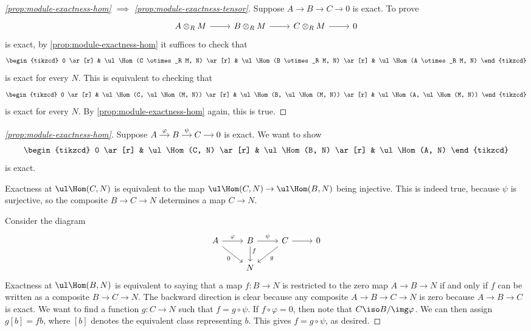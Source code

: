 \documentclass{standalone}
\begin{document}
\begin{proof}[\cref{prop:module-exactness-hom} \(\implies\)
  \cref{prop:module-exactness-tensor}]
  Suppose \(A \to B \to C \to 0\) is exact.
  To prove
  \[
    \begin{tikzcd}
    	A \otimes_R M \ar[r] &
    	B \otimes_R M \ar[r] &
    	C \otimes_R M \ar[r] &
    	0
    \end{tikzcd}
  \]
  is exact, by \cref{prop:module-exactness-hom} it suffices to check that
  \[
    \begin{tikzcd}
    	0 \ar[r] &
    	\ul\Hom(C \otimes_R M, N) \ar[r] &
    	\ul\Hom(B \otimes_R M, N) \ar[r] &
    	\ul\Hom(A \otimes_R M, N)
    \end{tikzcd}
  \]
  is exact for every \(N\).
  This is equivalent to checking that
  \[
    \begin{tikzcd}
    	0 \ar[r] &
    	\ul\Hom(C, \ul\Hom(M, N)) \ar[r] &
    	\ul\Hom(B, \ul\Hom(M, N)) \ar[r] &
    	\ul\Hom(A, \ul\Hom(M, N))
    \end{tikzcd}
  \]
  is exact for every \(N\).
  By \cref{prop:module-exactness-hom} again, this is true.
\end{proof}

\begin{proof}[\cref{prop:module-exactness-hom}]
  Suppose
  \(
    \begin{tikzcd}[cramped, column sep=small]
      A \ar[r, "\varphi"] & B \ar[r, "\psi"] & C \ar[r] & 0
    \end{tikzcd}
  \)
  is exact. We want to show
  \[
    \begin{tikzcd}
    	0 \ar[r] &
    	\ul\Hom(C, N) \ar[r] &
    	\ul\Hom(B, N) \ar[r] &
    	\ul\Hom(A, N)
    \end{tikzcd}
  \]
  is exact.

  Exactness at \(\ul\Hom(C, N)\) is equivalent to the map
  \(\ul\Hom(C, N) \to \ul\Hom(B, N)\) being injective.
  This is indeed true, because \(\psi\) is surjective,
  so the composite \(B \to C \to N\) determines a map \(C \to N\).

  Consider the diagram
  \[
    \begin{tikzcd}
    	A \ar[r, "\varphi"] \ar[rd, "0"'] &
        B \ar[r, "\psi"] \ar[d, "f" pos=0.3] &
        C \ar[r] \ar[ld, "g"]&
        0 \\
    	& N & &
    \end{tikzcd}
  \]
  Exactness at \(\ul\Hom(B, N)\) is equivalent to saying that a
  map \(f \colon B \to N\) is restricted to the zero map \(A \to B \to N\)
  if and only if \(f\) can be written as a composite \(B \to C \to N\).
  The backward direction is clear because any composite \(A \to B \to C \to N\)
  is zero because \(A \to B \to C\) is exact.
  We want to find a function \(g \colon C \to N\)
  such that \(f = g \circ \psi\).
  If \(f \circ \varphi = 0\), then note that \(C \iso B / \img \varphi\).
  We can then assign \(g [b] = f b\),
  where \([b]\) denotes the equivalent class representing \(b\).
  This gives \(f = g \circ \psi\), as desired.
\end{proof}
\end{document}

